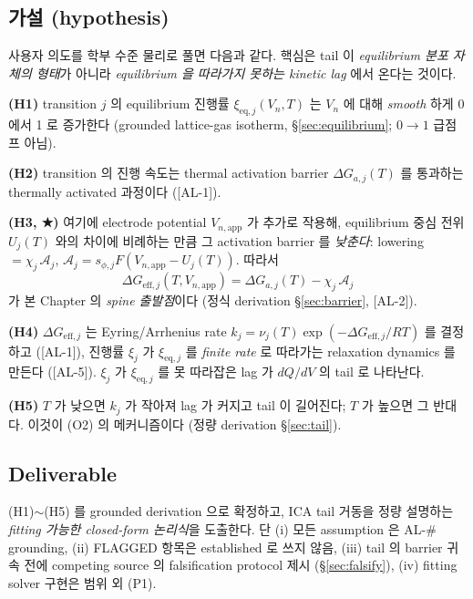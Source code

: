 \documentclass[11pt,a4paper]{article}
\newcommand{\eff}{\mathrm{eff}}
\newcommand{\eq}{\mathrm{eq}}
\newcommand{\app}{\mathrm{app}}
\newcommand{\AL}[1]{\textsf{[AL-#1]}}
\begin{document}
\subsection{가설 (hypothesis)}\label{sec:hypothesis}
사용자 의도를 학부 수준 물리로 풀면 다음과 같다. 핵심은 tail 이 \emph{equilibrium
분포 자체의 형태}가 아니라 \emph{equilibrium 을 따라가지 못하는 kinetic lag} 에서
온다는 것이다.

\textbf{(H1)} transition $j$ 의 equilibrium 진행률 $\xi_{\eq,j}(V_n,T)$ 는 $V_n$ 에 대해
\emph{smooth} 하게 0 에서 1 로 증가한다 (grounded lattice-gas isotherm, \S\ref{sec:equilibrium};
$0\!\to\!1$ 급점프 아님).

\textbf{(H2)} transition 의 진행 속도는 thermal activation barrier $\Delta G_{a,j}(T)$ 를
통과하는 thermally activated 과정이다 (\AL{1}).

\textbf{(H3, ★)} 여기에 electrode potential $V_{n,\app}$ 가 추가로 작용해, equilibrium
중심 전위 $U_j(T)$ 와의 차이에 비례하는 만큼 그 activation barrier 를 \emph{낮춘다}:
lowering $= \chi_j\,\mathcal A_j$, $\mathcal A_j = s_{\phi,j}F(V_{n,\app}-U_j(T))$. 따라서
\begin{equation}
\boxed{\;\Delta G_{\eff,j}(T,V_{n,\app}) = \Delta G_{a,j}(T) - \chi_j\,\mathcal A_j\;}
\label{eq:Geff_hyp}
\end{equation}
가 본 Chapter 의 \emph{spine 출발점}이다 (정식 derivation \S\ref{sec:barrier}, \AL{2}).

\textbf{(H4)} $\Delta G_{\eff,j}$ 는 Eyring/Arrhenius rate $k_j = \nu_j(T)\exp(-\Delta
G_{\eff,j}/RT)$ 를 결정하고 (\AL{1}), 진행률 $\xi_j$ 가 $\xi_{\eq,j}$ 를 \emph{finite
rate} 로 따라가는 relaxation dynamics 를 만든다 (\AL{5}). $\xi_j$ 가 $\xi_{\eq,j}$ 를
못 따라잡은 lag 가 $dQ/dV$ 의 tail 로 나타난다.

\textbf{(H5)} $T$ 가 낮으면 $k_j$ 가 작아져 lag 가 커지고 tail 이 길어진다; $T$ 가
높으면 그 반대다. 이것이 (O2) 의 메커니즘이다 (정량 derivation \S\ref{sec:tail}).

\subsection{Deliverable}\label{sec:deliverable}
(H1)$\sim$(H5) 를 grounded derivation 으로 확정하고, ICA tail 거동을 정량 설명하는
\emph{fitting 가능한 closed-form 논리식}을 도출한다. 단 (i) 모든 assumption 은 AL-\#
grounding, (ii) FLAGGED 항목은 established 로 쓰지 않음, (iii) tail 의 barrier 귀속
전에 competing source 의 falsification protocol 제시 (\S\ref{sec:falsify}), (iv)
fitting solver 구현은 범위 외 (P1).
\end{document}
